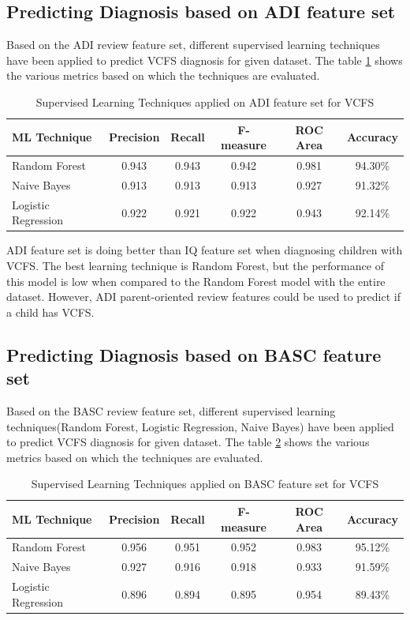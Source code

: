 \subsection{Predicting Diagnosis based on ADI feature set}
Based on the ADI review feature set, different supervised learning techniques have been applied to predict VCFS diagnosis for given dataset. The table \ref{table:616} shows the various metrics based on which the techniques are evaluated.
\begin{table}[h]
\begin{center}
\begin{tabular}{|l|c|c|c|c|c|}
\hline
\textbf{ML Technique}&	\textbf{Precision}&	\textbf{Recall}&	\textbf{F-measure}&	\textbf{ROC Area}&	\textbf{Accuracy}\\
\hline \hline
Random Forest&0.943&	0.943&	0.942&	0.981&	94.30\%\\
\hline
Naive Bayes&0.913&	0.913&	0.913&	0.927&	91.32\%\\
\hline
Logistic Regression& 0.922&	0.921&	0.922&	0.943&	92.14\%\\
\hline
\end{tabular}
\end{center}
\caption{Supervised Learning Techniques applied on ADI feature set for VCFS}
\label{table:616}
\end{table}

ADI feature set is doing better than IQ feature set when diagnosing children with VCFS. The best learning technique is Random Forest, but the performance of this model is low when compared to the Random Forest model with the entire dataset. However, ADI parent-oriented review features could be used to predict if a child has VCFS.

\subsection{Predicting Diagnosis based on BASC feature set}
Based on the BASC review feature set, different supervised learning techniques(Random Forest, Logistic Regression, Naive Bayes) have been applied to predict VCFS diagnosis for given dataset. The table \ref{table:617} shows the various metrics based on which the techniques are evaluated. 
\begin{table}[h]
\begin{center}
\begin{tabular}{|l|c|c|c|c|c|}
\hline
\textbf{ML Technique}&	\textbf{Precision}&	\textbf{Recall}&	\textbf{F-measure}&	\textbf{ROC Area}&	\textbf{Accuracy}\\
\hline \hline
Random Forest&0.956&	0.951&	0.952&	0.983&	95.12\%\\
\hline
Naive Bayes&0.927&	0.916&	0.918&	0.933&	91.59\%\\
\hline
Logistic Regression& 0.896&	0.894&	0.895&	0.954&	89.43\%\\
\hline
\end{tabular}
\end{center}
\caption{Supervised Learning Techniques applied on BASC feature set for VCFS}
\label{table:617}
\end{table}

